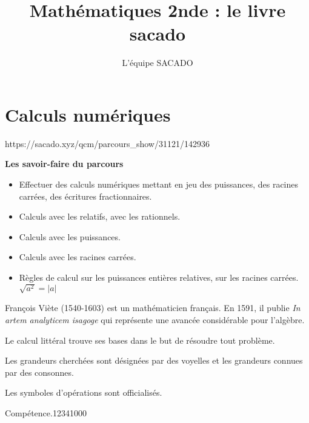 



\title{Mathématiques 2nde  : le livre sacado}
\author{L'équipe SACADO}

\parindent=0pt



\chapter{Calculs numériques}
{https://sacado.xyz/qcm/parcours_show/31121/142936}
{
 \begin{CpsCol}
	\textbf{Les savoir-faire du parcours}
 	\begin{itemize}
 
		\item Effectuer des calculs numériques mettant en jeu des puissances, des racines carrées, des écritures fractionnaires.
		\item Calculs avec les relatifs, avec les rationnels.
		\item Calculs avec les puissances.
		\item Calculs avec les racines carrées.
		\item Règles de calcul sur les puissances entières relatives, sur les racines carrées. $\sqrt {a^2} = |a|$ 
 
 	\end{itemize}
 \end{CpsCol}

\begin{His}
François Viète (1540-1603) est un mathématicien français. En 1591, il publie \textit{In artem analyticem isagoge} qui représente une avancée considérable pour l'algèbre.

Le calcul littéral trouve ses bases dans le but de résoudre tout problème.

Les grandeurs cherchées sont désignées par des voyelles et les grandeurs connues par des consonnes.

Les symboles d'opérations sont officialisés.
\end{His}

\begin{ExoDec}{Compétence.}{1234}{1}{0}{0}{0}
\end{ExoDec}
}


